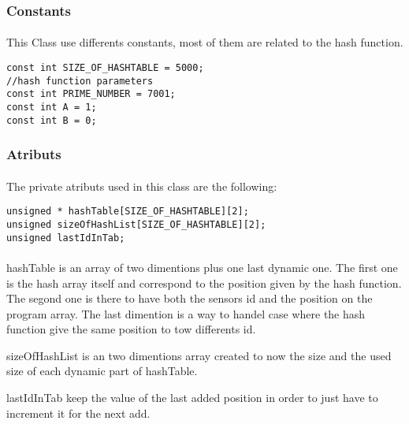 \documentclass[a4paper, 12pts]{article}
\begin{document}
\subsubsection{Constants}

\paragraph{}
	This Class use differents constants, most of them are related to the hash function.

\begin{lstlisting}
const int SIZE_OF_HASHTABLE = 5000;
//hash function parameters
const int PRIME_NUMBER = 7001;
const int A = 1;
const int B = 0;
\end{lstlisting}

\subsubsection{Atributs}

\paragraph{}
	The private atributs used in this class are the following:
\begin{lstlisting}
unsigned * hashTable[SIZE_OF_HASHTABLE][2];
unsigned sizeOfHashList[SIZE_OF_HASHTABLE][2];
unsigned lastIdInTab;
\end{lstlisting}

\paragraph{}
    hashTable is an array of two dimentions plus one last dynamic one. The first one is the hash array itself and correspond to the position given by the hash function. The segond one is there to have both the sensors id and the position on the program array. The last dimention is a way to handel case where the hash function give the same position to tow differents id.
    
    sizeOfHashList is an two dimentions array created to now the size and the used size of each dynamic part of hashTable.
    
    lastIdInTab keep the value of the last added position in order to just have to increment it for the next add.
    
\end{document}
